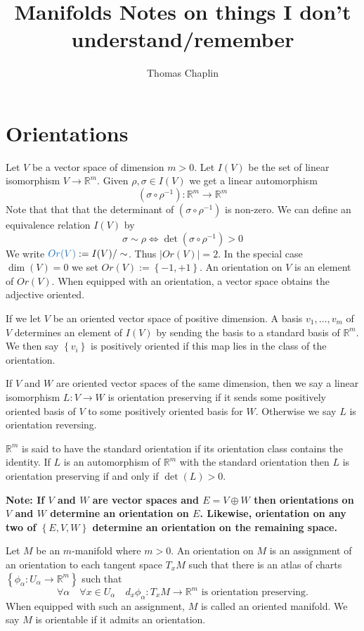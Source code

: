 \documentclass[11pt]{article}
\title{Manifolds Notes on things I don't understand/remember}
\author{Thomas Chaplin}
\date{}
\newcommand{\defeq}{:=}
\newcommand{\abs}[1]{|#1|}
\newcommand{\R}{\mathbb{R}}
\newenvironment{defin}
	{\begin{mdframed}[backgroundcolor=white, roundcorner=5pt, linewidth=1pt, linecolor=RoyalBlue]
		\setlength{\parindent}{0pt}}
	{\end{mdframed}}
\newcommand{\mdf}[1]{{\color{RoyalBlue} #1}}
\newenvironment{note}
	{\begin{mdframed}[backgroundcolor=white, linecolor=RubineRed, roundcorner=5pt, linewidth=1pt]\bfseries{Note:}\normalfont
	\setlength{\parindent}{0pt}}
	{\end{mdframed}}
\begin{document}
\maketitle

\section{Orientations}
Let $V$ be a vector space of dimension $m> 0$.
Let $I(V)$ be the set of linear isomorphism $V\to \R^m$.
Given $\rho, \sigma \in I(V)$ we get a linear automorphism
\[
	(\sigma \circ \rho^{-1}) : \R^m \to \R^m
\]
Note that that that the determinant of $(\sigma \circ \rho^{-1})$ is non-zero.
We can define an equivalence relation $I(V)$ by
\[
	\sigma \sim \rho \iff \det(\sigma\circ \rho^{-1}) > 0
\]
We write $\mdf{Or(V)}\defeq I(V)/\sim$.
Thus $\abs{Or(V)}=2$.
In the special case $\dim (V) = 0$ we set $Or(V)\defeq \left\{ -1, +1\right\}$.
An \mdf{orientation} on $V$ is an element of $Or(V)$.
When equipped with an orientation, a vector space obtains the adjective \mdf{oriented}.

If we let $V$ be an oriented vector space of positive dimension.
A basis $v_1, \dots , v_m$ of $V$ determines an element of $I(V)$ by sending the basis to a standard basis of $\R^m$.
We then say $\left\{ v_i\right\}$ is \mdf{positively oriented} if this map lies in the class of the orientation.

If $V$ and $W$ are oriented vector spaces of the same dimension, then we say a linear isomorphism $L: V \to W$ is \mdf{orientation preserving} if it sends some positively oriented basis of $V$ to some positively oriented basis for $W$.
Otherwise we say $L$ is \mdf{orientation reversing}.

$\R^m$ is said to have the \mdf{standard orientation} if its orientation class contains the identity.
If $L$ is an automorphism of $\R^m$ with the standard orientation then $L$ is orientation preserving if and only if $\det(L) >0$.

\begin{note}
If $V$ and $W$ are vector spaces and $E= V \oplus W$ then orientations on $V$ and $W$ determine an orientation on $E$.
Likewise, orientation on any two of $\left\{ E, V, W\right\}$ determine an orientation on the remaining space.
\end{note}

\begin{defin}
Let $M$ be an $m$-manifold where $m>0$.
An \mdf{orientation} on $M$ is an assignment of an orientation to each tangent space $T_xM$ such that there is an atlas of charts $\left\{ \phi_\alpha : U_\alpha \to \R^m\right\}$ such that
\[
	\forall \alpha \quad \forall x\in U_\alpha \quad d_x\phi_\alpha:T_xM \to \R^m\text{ is orientation preserving.}
\]
When equipped with such an assignment, $M$ is called an \mdf{oriented manifold}.
We say $M$ is \mdf{orientable} if it admits an orientation.
\end{defin}
\end{document}
